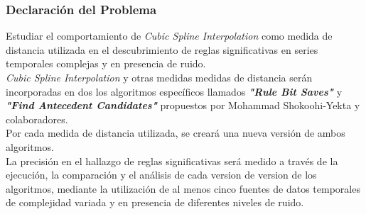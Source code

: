 \subsubsection{Declaraci\'on del Problema}
Estudiar el comportamiento de \textit{Cubic Spline Interpolation} como medida de distancia utilizada en el descubrimiento de reglas significativas en series temporales complejas y en presencia de ruido.\\
\textit{Cubic Spline Interpolation} y otras medidas medidas de distancia ser\'an incorporadas en dos los algoritmos espec\'ificos llamados \textit{\textbf{"Rule Bit Saves"}} y \textit{\textbf{"Find Antecedent Candidates"}} propuestos por Mohammad Shokoohi-Yekta y colaboradores.\\
Por cada medida de distancia utilizada, se crear\'a una nueva versi\'on de ambos algoritmos.\\
La precisi\'on en el hallazgo de reglas significativas ser\'a medido a trav\'es de la ejecuci\'on, la comparaci\'on y el an\'alisis de cada version de version de los algoritmos, mediante la utilizaci\'on de al menos cinco fuentes de datos temporales de complejidad variada y en presencia de diferentes niveles de ruido.
